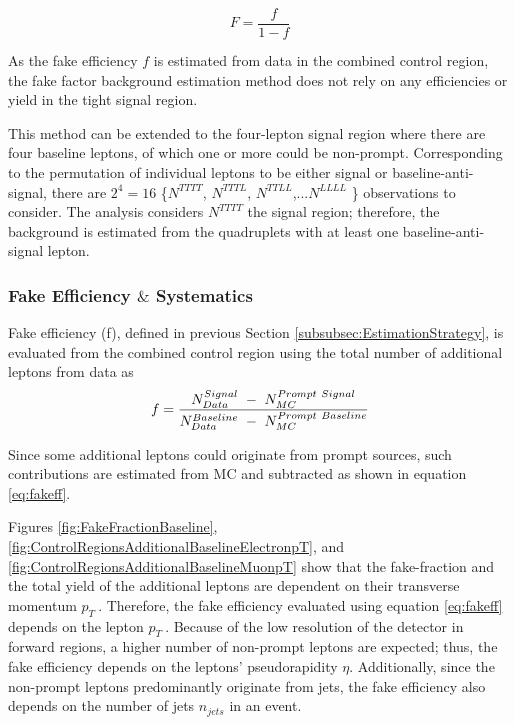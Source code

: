 \begin{equation}
    F =  \frac{f}{1-f}
\label{eqn:FakeFactor}
\end{equation}

As the fake efficiency $f$ is estimated from data in the combined control region, the fake factor background estimation method does not rely on any efficiencies or yield in the tight signal region.

This method can be extended to the four-lepton signal region where there are four baseline leptons, of which one or more could be non-prompt. Corresponding to the permutation of individual leptons to be either signal or baseline-anti-signal, there are $2^{4}=16$ \{$N^{TTTT}$, $N^{TTTL}$, $N^{TTLL}$,...$N^{LLLL}$ \} observations to consider. The analysis considers $N^{TTTT}$ the signal region; therefore, the background is estimated from the quadruplets with at least one baseline-anti-signal lepton.

\subsubsection{Fake Efficiency $\&$ Systematics}
\label{subsubsec:FakeEff}
Fake efficiency (f), defined in previous Section \ref{subsubsec:EstimationStrategy}, is evaluated from the combined control region using the total number of additional leptons from data as
\begin{equation}{\label{eq:fakeff}}
\begin{aligned}
f = \frac{ N_{Data}^{Signal}~-~N_{MC}^{Prompt~Signal}}{ N_{Data}^{Baseline}~-~N_{MC}^{Prompt~Baseline}}
\end{aligned}
\end{equation}

Since some additional leptons could originate from prompt sources, such contributions are estimated from MC and subtracted as shown in equation \ref{eq:fakeff}.

Figures \ref{fig:FakeFractionBaseline}, \ref{fig:ControlRegionsAdditionalBaselineElectronpT}, and \ref{fig:ControlRegionsAdditionalBaselineMuonpT} show that the fake-fraction and the total yield of the additional leptons are dependent on their transverse momentum $p_{T}~$. Therefore, the fake efficiency evaluated using equation \ref{eq:fakeff} depends on the lepton $p_{T}~$. Because of the low resolution of the detector in forward regions, a higher number of non-prompt leptons are expected; thus, the fake efficiency depends on the leptons' pseudorapidity $\eta$. Additionally, since the non-prompt leptons predominantly originate from jets, the fake efficiency also depends on the number of jets $n_{jets}$ in an event. 

